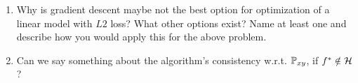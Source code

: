 \documentclass[a4paper]{article}
\makeatletter
\newcommand{\hlnum}[1]{\textcolor[rgb]{0.686,0.059,0.569}{#1}}%
\newcommand{\hlcom}[1]{\textcolor[rgb]{0.678,0.584,0.686}{\textit{#1}}}%
\newcommand{\hlopt}[1]{\textcolor[rgb]{0,0,0}{#1}}%
\newcommand{\hlstd}[1]{\textcolor[rgb]{0.345,0.345,0.345}{#1}}%
\newcommand{\hlkwb}[1]{\textcolor[rgb]{0.69,0.353,0.396}{#1}}%
\newcommand{\hlkwc}[1]{\textcolor[rgb]{0.333,0.667,0.333}{#1}}%
\newcommand{\hlkwd}[1]{\textcolor[rgb]{0.737,0.353,0.396}{\textbf{#1}}}%
\newenvironment{kframe}{%
 \def\at@end@of@kframe{}%
 \ifinner\ifhmode%
  \def\at@end@of@kframe{\end{minipage}}%
  \begin{minipage}{\columnwidth}%
 \fi\fi%
 \def\FrameCommand##1{\hskip\@totalleftmargin \hskip-\fboxsep
 \colorbox{shadecolor}{##1}\hskip-\fboxsep
     \hskip-\linewidth \hskip-\@totalleftmargin \hskip\columnwidth}%
 \MakeFramed {\advance\hsize-\width
   \@totalleftmargin\z@ \linewidth\hsize
   \@setminipage}}%
 {\par\unskip\endMakeFramed%
 \at@end@of@kframe}
\newenvironment{knitrout}{}{} %
\makeatother
\begin{document}
{\begin{enumerate}
\begin{knitrout}
\begin{kframe}
\begin{alltt}
  \hlcom{# create response}
  \hlstd{y} \hlkwb{<-} \hlstd{f_truth} \hlopt{+} \hlkwd{rnorm}\hlstd{(n,} \hlkwc{sd} \hlstd{=} \hlnum{2}\hlstd{)}

  \hlcom{# >>> do something <<<}


  \hlcom{# save results in list (performance, time)}
  \hlstd{result_list[[sim_nr]]} \hlkwb{<-} \hlstd{add_something_meaningful_here}

\hlstd{\}}
\end{alltt}
\end{kframe}
\end{knitrout}
 \item Why is gradient descent maybe not the best option for optimization of a linear model with $L2$ loss? What other options exist? Name at least one and describe how you would apply this for the above problem. 
 \item Can we say something about the algorithm's consistency w.r.t. $\mathbb{P}_{xy}$, if $f^\ast \notin \mathcal{H}$?
\end{enumerate}
}

\dlz
\end{document}
